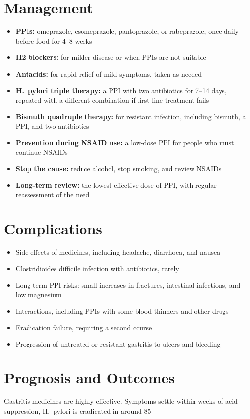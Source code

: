 \section*{Management}
\begin{itemize}
    \item \textbf{PPIs:} omeprazole, esomeprazole, pantoprazole, or rabeprazole, once daily before food for 4--8 weeks
    \item \textbf{H2 blockers:} for milder disease or when PPIs are not suitable
    \item \textbf{Antacids:} for rapid relief of mild symptoms, taken as needed
    \item \textbf{H.\ pylori triple therapy:} a PPI with two antibiotics for 7--14 days, repeated with a different combination if first-line treatment fails
    \item \textbf{Bismuth quadruple therapy:} for resistant infection, including bismuth, a PPI, and two antibiotics
    \item \textbf{Prevention during NSAID use:} a low-dose PPI for people who must continue NSAIDs
    \item \textbf{Stop the cause:} reduce alcohol, stop smoking, and review NSAIDs
    \item \textbf{Long-term review:} the lowest effective dose of PPI, with regular reassessment of the need
\end{itemize}

\section*{Complications}
\begin{itemize}
    \item Side effects of medicines, including headache, diarrhoea, and nausea
    \item Clostridioides difficile infection with antibiotics, rarely
    \item Long-term PPI risks: small increases in fractures, intestinal infections, and low magnesium
    \item Interactions, including PPIs with some blood thinners and other drugs
    \item Eradication failure, requiring a second course
    \item Progression of untreated or resistant gastritis to ulcers and bleeding
\end{itemize}

\section*{Prognosis and Outcomes}
Gastritis medicines are highly effective. Symptoms settle within weeks of acid suppression, H.\ pylori is eradicated in around 85%

